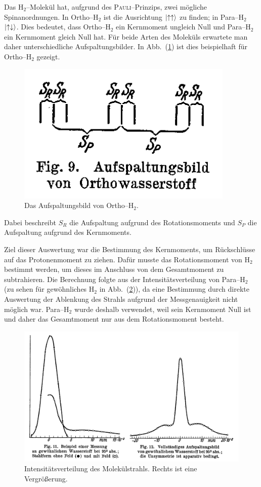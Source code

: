 \documentclass[sn-mathphys-num,iicol]{sn-jnl}
\theoremstyle{thmstyleone}
\theoremstyle{thmstyletwo}
\theoremstyle{thmstylethree}
\begin{document}
Das $\text{H}_2$--Molekül hat, aufgrund des \textsc{Pauli}--Prinzips, zwei mögliche Spinanordnungen.
In Ortho--$\text{H}_2$ ist die Ausrichtung $\ket{\uparrow\uparrow}$ zu finden; in Para--$\text{H}_2$ $\ket{\uparrow\downarrow}$.
Dies bedeutet, dass Ortho--$\text{H}_2$ ein Kernmoment ungleich Null und Para--$\text{H}_2$ ein Kernmoment gleich Null hat.
Für beide Arten des Moleküls erwartete man daher unterschiedliche Aufspaltungsbilder.
In Abb.\ (\ref{fig:ortho_aufspaltung}) ist dies beispielhaft für Ortho--$\text{H}_2$ gezeigt. 
\begin{figure}[t]
        \centering
        \includegraphics[width=.3\textwidth]{../vortrag/prosi_aufspaltungsbild_orthowasserstoff.png}
        \caption{Das Aufspaltungsbild von Ortho--$\text{H}_2$.\cite{FrischStern1933}} \label{fig:ortho_aufspaltung}
\end{figure}
Dabei beschreibt $S_R$ die Aufspaltung aufgrund des Rotationsmoments und $S_P$ die Aufspaltung aufgrund des Kernmoments.

Ziel dieser Auswertung war die Bestimmung des Kernmoments, um Rückschlüsse auf das Protonenmoment zu ziehen.
Dafür musste das Rotationsmoment von $\text{H}_2$ bestimmt werden, um dieses im Anschluss von dem Gesamtmoment zu subtrahieren.
Die Berechnung folgte aus der Intensitätsverteilung von Para--$\text{H}_2$ (zu sehen für gewöhnliches $\text{H}_2$ in Abb.\ (\ref{fig:graph})), da eine Bestimmung durch direkte Auswertung der Ablenkung des Strahls aufgrund der Messgenauigkeit nicht möglich war.
Para--$\text{H}_2$ wurde deshalb verwendet, weil sein Kernmoment Null ist und daher das Gesamtmoment nur aus dem Rotationsmoment besteht.
\begin{figure}[t]
        \centering
        \includegraphics[width=.5\textwidth]{../vortrag/prosi_frisch_stern_auswertung_graph.png}
        \caption{Intensitätsverteilung des Molekülstrahls. Rechts ist eine Vergrößerung.\cite{FrischStern1933}} \label{fig:graph}
\end{figure}
\end{document}
